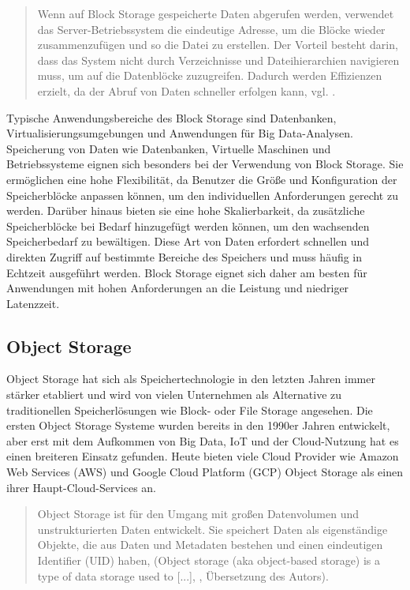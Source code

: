 \begin{quote}
	Wenn auf Block Storage gespeicherte Daten abgerufen werden, verwendet das Server-Betriebssystem die eindeutige Adresse, um die Blöcke wieder zusammenzufügen und so die Datei zu erstellen. Der Vorteil besteht darin, dass das System nicht durch Verzeichnisse und Dateihierarchien navigieren muss, um auf die Datenblöcke zuzugreifen. Dadurch werden Effizienzen erzielt, da der Abruf von Daten schneller erfolgen kann, vgl. \cite{ibm-storage}.
\end{quote}

Typische Anwendungsbereiche des Block Storage sind Datenbanken, Virtualisierungsumgebungen und Anwendungen für Big Data-Analysen. Speicherung von Daten wie Datenbanken, Virtuelle Maschinen und Betriebssysteme eignen sich besonders bei der Verwendung von Block Storage. Sie ermöglichen eine hohe Flexibilität, da Benutzer die Größe und Konfiguration der Speicherblöcke anpassen können, um den individuellen Anforderungen gerecht zu werden. Darüber hinaus bieten sie eine hohe Skalierbarkeit, da zusätzliche Speicherblöcke bei Bedarf hinzugefügt werden können, um den wachsenden Speicherbedarf zu bewältigen. Diese Art von Daten erfordert schnellen und direkten Zugriff auf bestimmte Bereiche des Speichers und muss häufig in Echtzeit ausgeführt werden. Block Storage eignet sich daher am besten für Anwendungen mit hohen Anforderungen an die Leistung und niedriger Latenzzeit.

\newpage

\subsection{Object Storage}

Object Storage hat sich als Speichertechnologie in den letzten Jahren immer stärker etabliert und wird von vielen Unternehmen als Alternative zu traditionellen Speicherlösungen wie Block- oder File Storage angesehen. Die ersten Object Storage Systeme wurden bereits in den 1990er Jahren entwickelt, aber erst mit dem Aufkommen von Big Data, IoT und der Cloud-Nutzung 
 hat es einen breiteren Einsatz gefunden. Heute bieten viele Cloud Provider wie Amazon Web Services (AWS) und Google Cloud Platform (GCP) Object Storage als einen ihrer Haupt-Cloud-Services an.
 
\begin{quote}
	Object Storage ist für den Umgang mit großen Datenvolumen und unstrukturierten Daten entwickelt. Sie speichert Daten als eigenständige Objekte, die aus Daten und Metadaten bestehen und einen eindeutigen Identifier (UID) haben, (\glqq Object storage (aka object-based storage) is a type of data storage used to [...]\grqq, \cite{dataCore-OS}, Übersetzung des Autors).
\end{quote}

